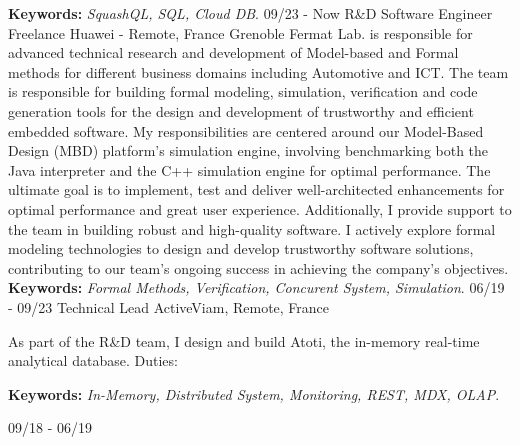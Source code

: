 \documentclass[]{friggeri-cv}
\begin{document}
\begin{entrylist}
{     \textbf{Keywords:} \emph{SquashQL, SQL, Cloud DB}.
    }
   \entry
    {09/23 - Now}
    {R&D Software Engineer Freelance}
    {Huawei - Remote, France}
    {Grenoble Fermat Lab. is responsible for advanced technical research and development of Model-based
     and Formal methods for different business domains including Automotive and ICT. The team is responsible
     for building formal modeling, simulation, verification and code generation tools for the design
     and development of trustworthy and efficient embedded software. 
     \newline
     My responsibilities are centered around our Model-Based Design (MBD) platform's simulation engine,
     involving benchmarking both the Java interpreter and the C++ simulation engine for optimal performance.
     The ultimate goal is to implement, test and deliver well-architected enhancements for optimal performance
     and great user experience. Additionally, I provide support to the team in building robust and high-quality
     software. I actively explore formal modeling technologies to design and develop trustworthy software
     solutions, contributing to our team's ongoing success in achieving the company's objectives.
     \textbf{Keywords:} \emph{Formal Methods, Verification, Concurent System, Simulation}.
    }
   \entry
    {06/19 - 09/23}
    {Technical Lead}
    {ActiveViam, Remote, France}
    {As part of the R\&D team, I design and build Atoti, the in-memory real-time analytical database. Duties:
        \begin{itemize}
        \end{itemize}
        \textbf{Keywords:} \emph{In-Memory, Distributed System, Monitoring, REST, MDX, OLAP}.
    }
  \entry
    {09/18 - 06/19}

\end{entrylist}
\end{document}
